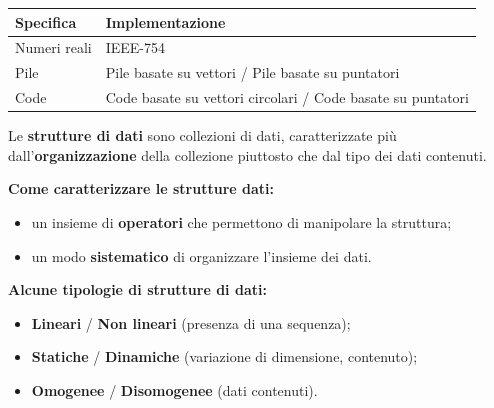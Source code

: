 \documentclass[12pt, a4paper]{article}
\begin{document}
\begin{center}
\begin{tabular}{ll}
\toprule
\textbf{Specifica} & \textbf{Implementazione} \\
\midrule
Numeri reali & IEEE-754 \\
Pile & Pile basate su vettori / Pile basate su puntatori \\
Code & Code basate su vettori circolari / Code basate su puntatori \\
\bottomrule
\end{tabular}
\end{center}

\begin{tcolorbox}[colback=lightergray!10, colframe=tocsec, title=\textbf{Definizione: Strutture di Dati}]
Le \textbf{strutture di dati} sono collezioni di dati, caratterizzate più dall'\textbf{organizzazione} della collezione piuttosto che dal tipo dei dati contenuti.
\end{tcolorbox}

\textbf{Come caratterizzare le strutture dati:}
\begin{itemize}
    \item un insieme di \textbf{operatori} che permettono di manipolare la struttura;
    \item un modo \textbf{sistematico} di organizzare l'insieme dei dati.
\end{itemize}

\textbf{Alcune tipologie di strutture di dati:}
\begin{itemize}
    \item \textbf{Lineari} / \textbf{Non lineari} (presenza di una sequenza);
    \item \textbf{Statiche} / \textbf{Dinamiche} (variazione di dimensione, contenuto);
    \item \textbf{Omogenee} / \textbf{Disomogenee} (dati contenuti).
\end{itemize}
\end{document}
